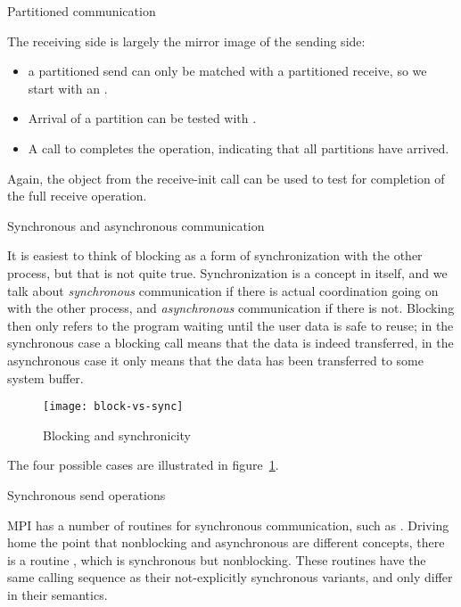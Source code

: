 \begin{mpifournote}{Partitioned communication}

The receiving side is largely the mirror image of the sending side:
%
%
\begin{itemize}
\item a partitioned send can only be matched with a partitioned receive,
  so we start with an . 
\item Arrival of a partition can be tested with .
\item A call to  completes the operation,
  indicating that all partitions have arrived.
\end{itemize}
Again, the  object from the receive-init call can
be used to test for completion of the full receive operation.

\end{mpifournote}

 {Synchronous and asynchronous communication}

It is easiest to think of blocking as a form of synchronization with
the other process, but that is not quite true. Synchronization is a
concept in itself, and we talk about \emph{synchronous} communication
if there is actual coordination going on with the other process,
and \emph{asynchronous} communication if there is not. Blocking then
only refers to the program waiting until the user data is safe
to reuse; in the synchronous case a blocking call means that the data
is indeed transferred, in the asynchronous case it only means that the
data has been transferred to some system buffer.
%
\begin{figure}[ht]
\texttt{[image: block-vs-sync]}
\caption{Blocking and synchronicity}
\label{fig:block-sync}
\end{figure}
The four possible cases are illustrated in figure~\ref{fig:block-sync}.

 {Synchronous send operations}
\label{sec:syncsend}

MPI has a number of routines for synchronous communication,
such as .
Driving home the point that nonblocking and asynchronous are
different concepts, there is a routine ,
which is synchronous but nonblocking.
These routines have the same calling sequence as their not-explicitly
synchronous variants, and only differ in their semantics.

